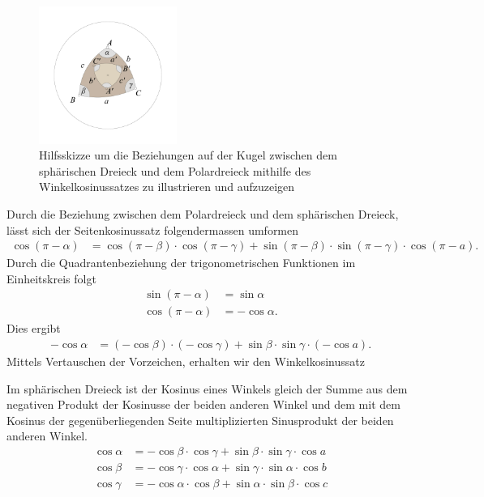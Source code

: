 \begin{refsection}
\begin{figure}[htbp]
\centering
\includegraphics[width=0.4\textwidth]{kugel/PolarWinkelkosinus.jpg}
\caption{Hilfsskizze um die Beziehungen auf der Kugel zwischen dem sphärischen Dreieck und dem Polardreieck mithilfe des Winkelkosinussatzes zu illustrieren und aufzuzeigen}
\end{figure}

Durch die Beziehung zwischen dem Polardreieck und dem sphärischen Dreieck, lässt sich der Seitenkosinussatz folgendermassen umformen
\begin{align*}
{\cos (\pi-\alpha)} &= {\cos (\pi-\beta)} \cdot {\cos (\pi-\gamma)} + {\sin(\pi-\beta)} \cdot {\sin(\pi-\gamma)} \cdot {\cos (\pi-a)}.
\end{align*}
Durch die Quadrantenbeziehung der trigonometrischen Funktionen im Einheitskreis folgt
\begin{align*}
\sin (\pi-\alpha) &= \sin \alpha\\
\cos (\pi-\alpha) &= - \cos \alpha.
\end{align*}
Dies ergibt
\begin{align*}
{-\cos \alpha} &= {(-\cos \beta)} \cdot {(-\cos \gamma)} + {\sin \beta} \cdot {\sin \gamma} \cdot {(-\cos a)}.
\end{align*}
Mittels Vertauschen der Vorzeichen, erhalten wir den Winkelkosinussatz

\begin{satz}Im sphärischen Dreieck ist der Kosinus eines Winkels gleich der Summe aus dem negativen Produkt der Kosinusse der beiden anderen Winkel und dem mit dem Kosinus der gegenüberliegenden Seite multiplizierten Sinusprodukt der beiden anderen Winkel.
\begin{align*}
{\cos \alpha} &= {-\cos \beta} \cdot {\cos \gamma} + {\sin \beta} \cdot {\sin \gamma} \cdot {\cos a}\\
{\cos \beta} &= {-\cos \gamma} \cdot {\cos \alpha} + {\sin \gamma} \cdot {\sin \alpha} \cdot {\cos b}\\
{\cos \gamma} &= {-\cos \alpha} \cdot {\cos \beta} + {\sin \alpha} \cdot {\sin \beta} \cdot {\cos c}\\
\end{align*}
\label{skript:kugel:satz:Winkelkosinussatz}
\end{satz}


\end{refsection}

